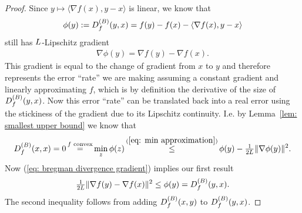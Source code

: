 \begin{proof}
	Since \(y\mapsto \langle\nabla f(x), y-x\rangle\) is linear, we know that
	\begin{align*}
		\phi(y):=D^{(B)}_{f}(y,x) = f(y)-f(x)-\langle \nabla f(x), y-x\rangle 
	\end{align*}
	still has \(L\)-Lipschitz gradient
	\begin{align}\label{eq: bregman divergence gradient}
		\nabla\phi(y) = \nabla f(y) - \nabla f(x).
	\end{align}
	This gradient is equal to the change of gradient from \(x\) to \(y\) and 
	therefore represents the error ``rate'' we are making assuming a constant gradient
	and linearly approximating \(f\), which is by definition the derivative of the size of
	\(D^{(B)}_{f}(y,x)\). Now this error ``rate'' can be translated
 	back into a real error using the stickiness of the gradient due to
	its Lipschitz continuity. I.e. by Lemma~\ref{lem: smallest upper bound} we know that
	\begin{align*}
		\bregmanDiv{f}(x,x) = 0
		\xeq{f\text{ convex}} \min_z\phi(z)
		\xle{(\ref{eq: min approximation})} \phi(y) - \tfrac{1}{2\ubound}\|\nabla \phi(y)\|^2.
	\end{align*}
	Now (\ref{eq: bregman divergence gradient}) implies our first result
	\begin{align*}
		\tfrac{1}{2L}\|\nabla f(y) - \nabla f(x)\|^2
		\le \phi(y) =D^{(B)}_{f}(y,x).
	\end{align*}
	The second inequality follows from adding \(D^{(B)}_{f}(x,y)\) to
	\(D^{(B)}_{f}(y,x)\).
\end{proof}

